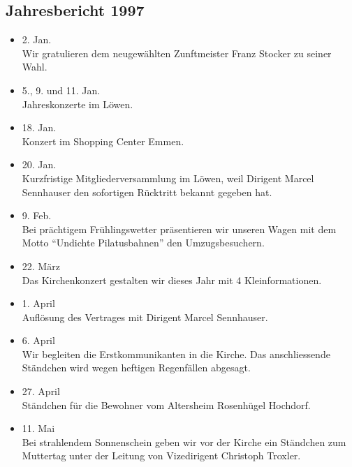 \subsection{Jahresbericht 1997}

\begin{history}


    \begin{itemize}

        \item[]2. Jan.\\
        Wir gratulieren dem neugewählten Zunftmeister Franz Stocker zu seiner
        Wahl.

        \item[]5., 9. und 11. Jan.\\
        Jahreskonzerte im Löwen.

        \item[]18. Jan.\\
        Konzert im Shopping Center Emmen.

        \item[]20. Jan.\\
        Kurzfristige Mitgliederversammlung im Löwen, weil Dirigent Marcel
        Sennhauser den sofortigen Rücktritt bekannt gegeben hat.

        \item[]9. Feb.\\
        Bei prächtigem Frühlingswetter präsentieren wir unseren Wagen mit dem
        Motto \enquote{Undichte Pilatusbahnen} den Umzugsbesuchern.

        \item[]22. März\\
        Das Kirchenkonzert gestalten wir dieses Jahr mit 4 Kleinformationen.

        \item[]1. April\\
        Auflösung des Vertrages mit Dirigent Marcel Sennhauser.

        \item[]6. April\\
        Wir begleiten die Erstkommunikanten in die Kirche. Das anschliessende
        Ständchen wird wegen heftigen Regenfällen abgesagt.

        \item[]27. April\\
        Ständchen für die Bewohner vom Altersheim Rosenhügel Hochdorf.

        \item[]11. Mai\\
        Bei strahlendem Sonnenschein geben wir vor der Kirche ein Ständchen zum
        Muttertag unter der Leitung von Vizedirigent Christoph Troxler.


\end{itemize}
\end{history}
